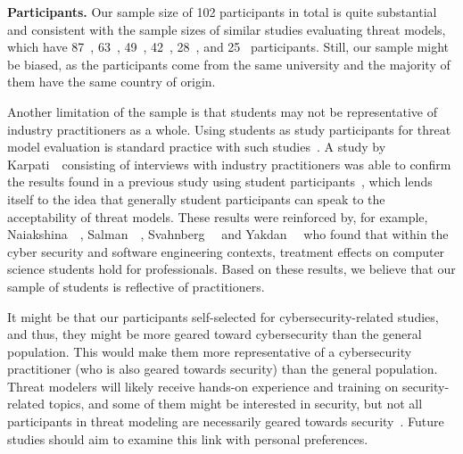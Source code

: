 \textbf{Participants.}
Our sample size of 102 participants in total is quite substantial and consistent with the sample sizes of similar studies evaluating threat models, which have 87~\cite{karpatiInvestigatingSecurityThreats2015}, 63~\cite{lallieEmpiricalEvaluationEffectiveness2017,opdahlExperimentalComparisonAttack2009}, 49~\cite{broccia2025evaluating}, 42~\cite{kattaComparingTwoTechniques2010}, 28~\cite{labunetsExperimentalComparisonTwo2013}, and 25~\cite{broccia_assessing_2024} participants. Still, our sample might be biased, as the participants come from the same university and the majority of them have the same country of origin. 

Another limitation of the sample is that students may not be representative of industry practitioners as a whole. Using students as study participants for threat model evaluation is standard practice with such studies~\cite{lallieEmpiricalEvaluationEffectiveness2017,labunetsExperimentalComparisonTwo2013,opdahlExperimentalComparisonAttack2009,karpatiInvestigatingSecurityThreats2015,kattaComparingTwoTechniques2010,scandariato2015descriptive}. A study by Karpati~\etal\ consisting of interviews with industry practitioners was able to confirm the results found in a previous study using student participants~\cite{karpatiComparingAttackTrees2014}, which lends itself to the idea that generally student participants can speak to the acceptability of threat models. These results were reinforced by, for example, Naiakshina~\etal~\cite{naiakshinaConductingSecurityDeveloper2020}, Salman~\etal~\cite{salmanAreStudentsRepresentatives2015}, Svahnberg~\etal~\cite{svahnbergUsingStudentsSubjects2008} and Yakdan~\etal~\cite{yakdanHelpingJohnnyAnalyze2016} who found that within the cyber security and software engineering contexts, treatment effects on computer science students hold for professionals. Based on these results, we believe that our sample of students is reflective of practitioners. 

It might be that our participants self-selected for cybersecurity-related studies, and thus, they might be more geared toward cybersecurity than the general population. This would make them more representative of a cybersecurity practitioner (who is also geared towards security) than the general population. Threat modelers will likely receive hands-on experience and training on security-related topics, and some of them might be interested in security, but not all participants in threat modeling are necessarily geared towards security~\cite{verreydt2024threat,shostack2008experiences}. Future studies should aim to examine this link with personal preferences. 

